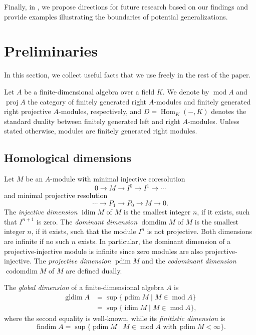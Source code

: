 \documentclass[a4paper]{amsart}
\theoremstyle{definition}
\theoremstyle{remark}
\numberwithin{equation}{theorem}
\newcommand{\Dfn}[1]{\emph{\color{blue}#1}} %
\renewcommand{\mod}{\operatorname{mod}}
\newcommand{\findim}{\operatorname{findim}}
\newcommand{\proj}{\operatorname{proj}}
\newcommand{\Hom}{\operatorname{Hom}}
\newcommand{\domdim}{\operatorname{domdim}}
\newcommand{\codomdim}{\operatorname{codomdim}}
\newcommand{\idim}{\operatorname{idim}}
\newcommand{\pdim}{\operatorname{pdim}}
\newcommand{\gldim}{\operatorname{gldim}}
\newcommand{\K}{K}
\begin{document}
Finally, in , we propose directions for future research based on our findings and provide examples illustrating the boundaries of potential generalizations.

\section{Preliminaries}\label{sec:preliminaries}
In this section, we collect useful facts that we use freely in the rest of the paper.

Let $A$ be a finite-dimensional algebra over a field $ \K $.
We denote by $ \mod A$ and $\proj A$ the category of finitely generated right $ A $-modules and finitely generated right projective $ A $-modules, respectively, and $D=\Hom_\K(-,\K)$ denotes the standard duality between finitely generated left and right $ A $-modules.
Unless stated otherwise, modules are finitely generated right modules.


\subsection{Homological dimensions}

Let $M$ be an $A$-module with minimal injective coresolution
$$0 \rightarrow M \rightarrow I^0 \rightarrow I^1 \rightarrow \cdots $$
and minimal projective resolution
$$\cdots \rightarrow P_1 \rightarrow P_0 \rightarrow M \rightarrow 0.$$
The \Dfn{injective dimension} $\idim M$ of $M$ is the smallest integer $n$, if it exists, such that $ I^{n+1} $ is zero.
The \Dfn{dominant dimension} $\domdim M$ of $M$ is the smallest integer $n$, if it exists, such that the module $I^n$ is not projective.
Both dimensions are infinite if no such $n$ exists.
In particular, the dominant dimension of a projective-injective module is infinite since zero modules are also projective-injective.
The \Dfn{projective dimension} $\pdim M$ and the \Dfn{codominant dimension} $\codomdim M$ of $M$ are defined dually.

The \Dfn{global dimension} of a finite-dimensional algebra $A$ is
\begin{align*}
    \gldim A &= \sup \bigl\{ \pdim M \mid M \in \mod A \bigr\}  \\
            &= \sup \bigl\{ \idim M \mid M \in \mod A \bigr\}   ,
\end{align*}
where the second equality is well-known, while its \Dfn{finitistic dimension} is
\[
  \findim A =\sup\bigl\{\pdim M \mid M\in\mod A \text{ with} \, \pdim M<\infty\bigr\}.
\]
\end{document}
